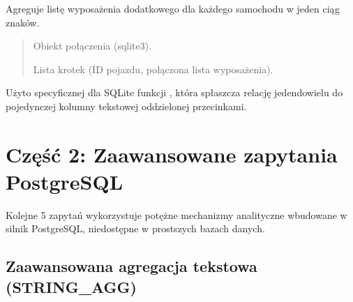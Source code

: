\documentclass[a4paper,11pt,english,openany,oneside]{sphinxmanual}
\begin{document}
\begin{savenotes}\begin{fulllineitems}

\pysigstartsignatures
\pysiglinewithargsret
{}
{}
{}
\pysigstopsignatures
\sphinxAtStartPar
Agreguje listę wyposażenia dodatkowego dla każdego samochodu w jeden ciąg znaków.
\begin{quote}\begin{description}
\sphinxAtStartPar
{} \textendash{} Obiekt połączenia (sqlite3).

\sphinxAtStartPar
Lista krotek (ID pojazdu, połączona lista wyposażenia).

\end{description}\end{quote}

\sphinxAtStartPar
{} Użyto specyficznej dla SQLite funkcji , która spłaszcza relację jeden\sphinxhyphen{}do\sphinxhyphen{}wielu do pojedynczej kolumny tekstowej oddzielonej przecinkami.

\end{fulllineitems}\end{savenotes}



\section{Część 2: Zaawansowane zapytania PostgreSQL}
\label{\detokenize{rozdzial_5/index:czesc-2-zaawansowane-zapytania-postgresql}}
\sphinxAtStartPar
Kolejne 5 zapytań wykorzystuje potężne mechanizmy analityczne wbudowane w silnik PostgreSQL, niedostępne w prostszych bazach danych.


\subsection{Zaawansowana agregacja tekstowa (STRING\_AGG)}
\label{\detokenize{rozdzial_5/index:zaawansowana-agregacja-tekstowa-string-agg}}
\end{document}

